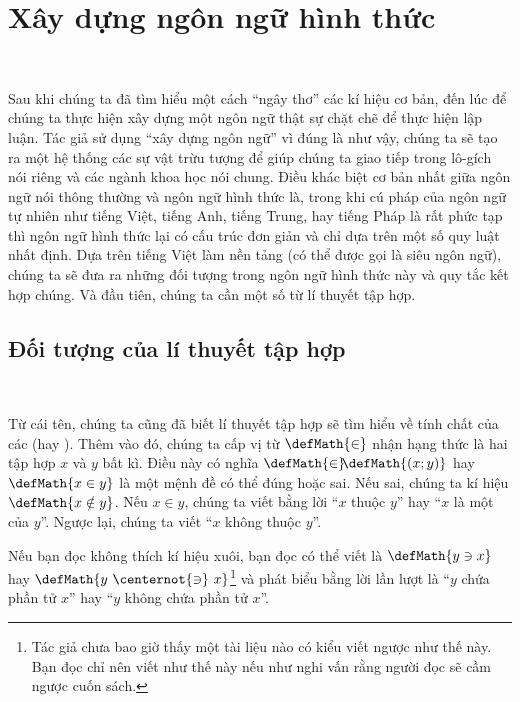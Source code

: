 \section{Xây dựng ngôn ngữ hình thức}

\ 

Sau khi chúng ta đã tìm hiểu một cách ``ngây thơ'' các kí hiệu cơ bản, đến lúc để chúng ta thực hiện xây dựng một ngôn ngữ thật sự chặt chẽ để thực hiện lập luận. Tác giả sử dụng ``xây dựng ngôn ngữ'' vì đúng là như vậy, chúng ta sẽ tạo ra một hệ thống các sự vật trừu tượng để giúp chúng ta giao tiếp trong lô-gích nói riêng và các ngành khoa học nói chung. Điều khác biệt cơ bản nhất giữa ngôn ngữ nói thông thường và ngôn ngữ hình thức là, trong khi cú pháp của ngôn ngữ tự nhiên như tiếng Việt, tiếng Anh, tiếng Trung, hay tiếng Pháp là rất phức tạp thì ngôn ngữ hình thức lại có cấu trúc đơn giản và chỉ dựa trên một số quy luật nhất định. Dựa trên tiếng Việt làm nền tảng (có thể được gọi là siêu ngôn ngữ), chúng ta sẽ đưa ra những đối tượng trong ngôn ngữ hình thức này và quy tắc kết hợp chúng. Và đầu tiên, chúng ta cần một số từ lí thuyết tập hợp.

\subsection{Đối tượng của lí thuyết tập hợp}

\

Từ cái tên, chúng ta cũng đã biết lí thuyết tập hợp sẽ tìm hiểu về tính chất của các  (hay ). Thêm vào đó, chúng ta cấp vị từ $\defMath{\in}$ nhận hạng thức là hai tập hợp $x$ và $y$ bất kì. Điều này có nghĩa $\defMath{\in}\hspace{-0.25em}\defMath{(x; y)}$ hay $\defMath{x \in y}$ là một mệnh đề có thể đúng hoặc sai. Nếu sai, chúng ta kí hiệu $\defMath{x \notin y}$. Nếu $x \in y$, chúng ta viết bằng lời ``$x$ thuộc $y$'' hay ``$x$ là một  của $y$''. Ngược lại, chúng ta viết ``$x$ không thuộc $y$''.

Nếu bạn đọc không thích kí hiệu xuôi, bạn đọc có thể viết là $\defMath{y \ni x}$ hay $\defMath{y\ \centernot{\ni}\ x}$\footnote{Tác giả chưa bao giờ thấy một tài liệu nào có kiểu viết ngược như thế này. Bạn đọc chỉ nên viết như thế này nếu như nghi vấn rằng người đọc sẽ cầm ngược cuốn sách.} và phát biểu bằng lời lần lượt là ``$y$ chứa phần tử $x$'' hay ``$y$ không chứa phần tử $x$''.

